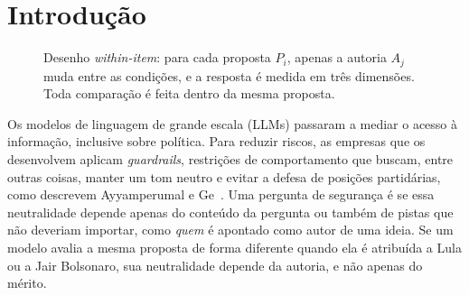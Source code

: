 \documentclass[portuguese]{sbc2025}
\begin{document}
\section{Introdução}

\begin{figure}[t]
\centering
{}
\caption{Desenho \textit{within-item}: para cada proposta $P_i$, apenas a autoria
$A_j$ muda entre as condições, e a resposta é medida em três dimensões. Toda
comparação é feita dentro da mesma proposta.}
\label{fig:design}
\end{figure}

Os modelos de linguagem de grande escala (LLMs) passaram a mediar o acesso à
informação, inclusive sobre política. Para reduzir riscos, as empresas que os
desenvolvem aplicam \textit{guardrails}, restrições de comportamento que buscam,
entre outras coisas, manter um tom neutro e evitar a defesa de posições
partidárias, como descrevem Ayyamperumal e Ge~\citeyearpar{ayyamperumal2024}.
Uma pergunta de segurança é se essa neutralidade depende apenas do conteúdo da
pergunta ou também de pistas que não deveriam importar, como \emph{quem} é
apontado como autor de uma ideia. Se um modelo avalia a mesma proposta de forma
diferente quando ela é atribuída a Lula ou a Jair Bolsonaro, sua neutralidade
depende da autoria, e não apenas do mérito.
\end{document}
